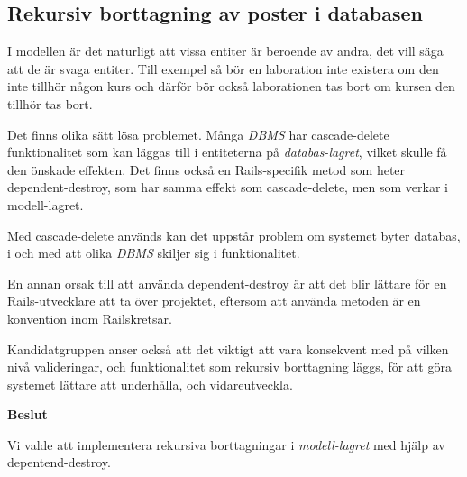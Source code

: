 \subsection{Rekursiv borttagning av poster i databasen}

I modellen är det naturligt att vissa entiter är beroende av andra, det vill säga att de är svaga entiter. Till exempel så bör en laboration inte existera om den inte tillhör någon kurs och därför bör också laborationen tas bort om kursen den tillhör tas bort. 

Det finns olika sätt lösa problemet. Många \emph{DBMS} har cascade-delete funktionalitet som kan läggas till i entiteterna på \emph{databas-lagret}, vilket skulle få den önskade effekten. Det finns också en Rails-specifik metod som heter dependent-destroy, som har samma effekt som cascade-delete, men som verkar i modell-lagret.

Med cascade-delete används kan det uppstår problem om systemet byter databas, i och med att olika \emph{DBMS} skiljer sig i funktionalitet.

En annan orsak till att använda dependent-destroy är att det blir lättare för en Rails-utvecklare att ta över projektet, eftersom att använda metoden är en konvention inom Railskretsar.

Kandidatgruppen anser också att det viktigt att vara konsekvent med på vilken nivå valideringar, och funktionalitet som rekursiv borttagning läggs, för att göra systemet lättare att underhålla, och vidareutveckla.   

\begin{flushright}
  
  \textbf{Beslut}
  
  Vi valde att implementera rekursiva borttagningar i \emph{modell-lagret} med hjälp av depentend-destroy.
\end{flushright}
